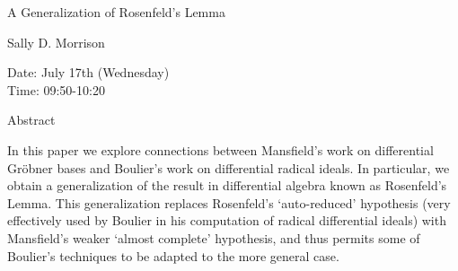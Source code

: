 \begin{center}
\LARGE
A Generalization of Rosenfeld's Lemma
\end{center}

\begin{center}
\Large
Sally D. Morrison
\end{center}

\noindent
Date:  July 17th (Wednesday)\\
Time:  09:50-10:20\\

\begin{center}
\large
Abstract
\end{center}

In this paper we explore connections between Mansfield's work on differential Gr\"obner bases and
Boulier's work on differential radical ideals. In particular, we obtain a generalization of the result
in differential algebra known as Rosenfeld's Lemma. This generalization replaces Rosenfeld's
`auto-reduced' hypothesis (very effectively used by Boulier in his computation of radical
differential ideals) with Mansfield's weaker `almost complete' hypothesis, and thus permits some
of Boulier's techniques to be adapted to the more general case. 

